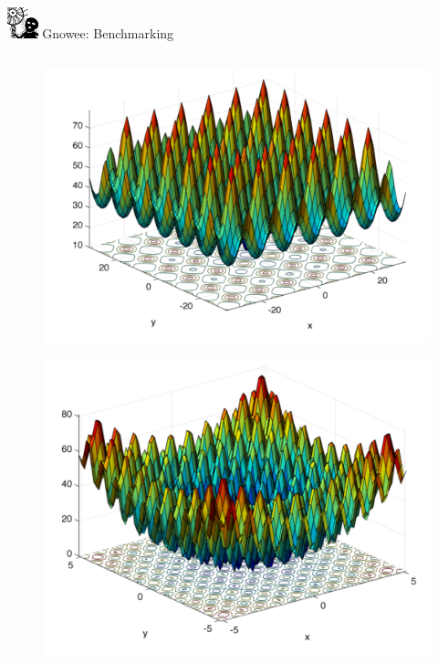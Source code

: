 \documentclass[xcolor=x11names,compress]{beamer}
\renewcommand{\(}{\begin{columns}}
\renewcommand{\)}{\end{columns}}
\newcommand{\<}[1]{\begin{column}{#1}}
\renewcommand{\>}{\end{column}}
\begin{document}
\begin{frame}{\includegraphics[width=0.35in]{../figs/Gnowee.png} Gnowee: Benchmarking \cite{Walton2013a,Yang2014,Civicioglu2013}}
\begin{columns}
    \begin{column}{0.33\linewidth}
      \vspace{-.9cm} 
      \begin{figure}[htp]
        \centering
        \includegraphics[width=1.0\textwidth, height=0.25\textheight]{../figs/Ackley.png} 
        \vspace{-0.35cm}
      \end{figure}        
      \vspace{-1.4cm} 
      \begin{figure}[htp]
        \centering
        \includegraphics[width=1.0\textwidth, height=0.25\textheight]{../figs/Rastrigin.png} 

\end{figure}
\end{column}
\end{columns}
\end{frame}
\end{document}
